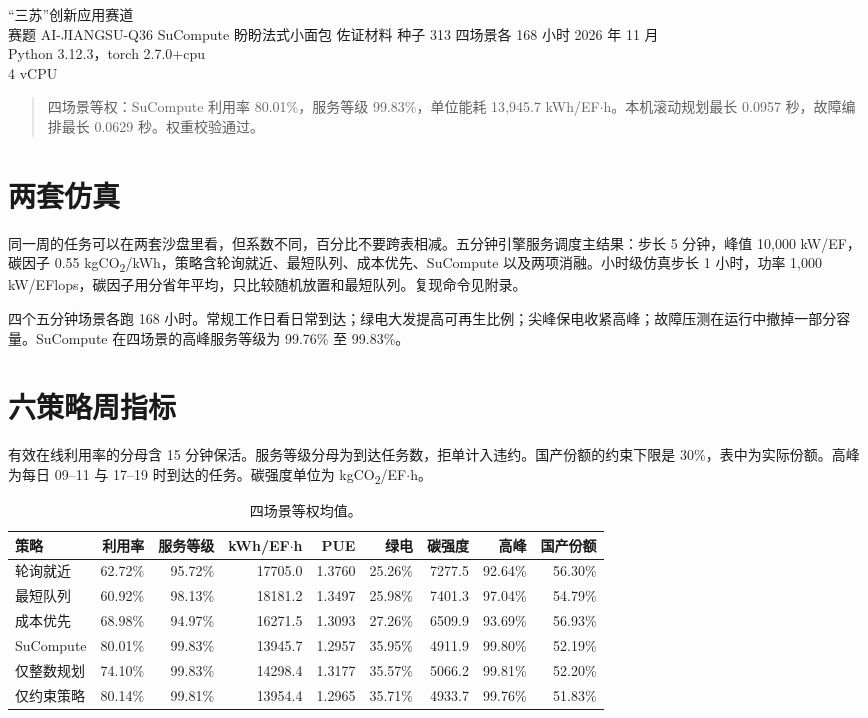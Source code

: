 

\contesttitlepage
  {“三苏”创新应用赛道\\赛题 AI-JIANGSU-Q36}
  {SuCompute}
  {盼盼法式小面包}
  {佐证材料}
  {种子 313 \quad 四场景各 168 小时}
  {2026 年 11 月\\Python 3.12.3，torch 2.7.0+cpu\\4 vCPU}

\begin{abstract}
四场景等权：SuCompute 利用率 80.01\%，服务等级 99.83\%，单位能耗 13{,}945.7 kWh/EF$\cdot$h。本机滚动规划最长 0.0957 秒，故障编排最长 0.0629 秒。权重校验通过。
\end{abstract}

\section{两套仿真}
同一周的任务可以在两套沙盘里看，但系数不同，百分比不要跨表相减。五分钟引擎服务调度主结果：步长 5 分钟，峰值 10{,}000 kW/EF，碳因子 0.55 kgCO\textsubscript{2}/kWh，策略含轮询就近、最短队列、成本优先、SuCompute 以及两项消融。小时级仿真步长 1 小时，功率 1{,}000 kW/EFlops，碳因子用分省年平均，只比较随机放置和最短队列。复现命令见附录。

四个五分钟场景各跑 168 小时。常规工作日看日常到达；绿电大发提高可再生比例；尖峰保电收紧高峰；故障压测在运行中撤掉一部分容量。SuCompute 在四场景的高峰服务等级为 99.76\% 至 99.83\%。

\section{六策略周指标}
有效在线利用率的分母含 15 分钟保活。服务等级分母为到达任务数，拒单计入违约。国产份额的约束下限是 30\%，表中为实际份额。高峰为每日 09--11 与 17--19 时到达的任务。碳强度单位为 kgCO\textsubscript{2}/EF$\cdot$h。

\begin{table}[ht]
\centering
\caption{四场景等权均值。}
\label{tab:six}
\footnotesize
\setlength{\tabcolsep}{2.6pt}
\begin{tabular}{lrrrrrrrr}
\toprule
策略 & 利用率 & 服务等级 & kWh/EF$\cdot$h & PUE & 绿电 & 碳强度 & 高峰 & 国产份额 \\
\midrule
轮询就近 & 62.72\% & 95.72\% & 17705.0 & 1.3760 & 25.26\% & 7277.5 & 92.64\% & 56.30\% \\
最短队列 & 60.92\% & 98.13\% & 18181.2 & 1.3497 & 25.98\% & 7401.3 & 97.04\% & 54.79\% \\
成本优先 & 68.98\% & 94.97\% & 16271.5 & 1.3093 & 27.26\% & 6509.9 & 93.69\% & 56.93\% \\
SuCompute & 80.01\% & 99.83\% & 13945.7 & 1.2957 & 35.95\% & 4911.9 & 99.80\% & 52.19\% \\
仅整数规划 & 74.10\% & 99.83\% & 14298.4 & 1.3177 & 35.57\% & 5066.2 & 99.81\% & 52.20\% \\
仅约束策略 & 80.14\% & 99.81\% & 13954.4 & 1.2965 & 35.71\% & 4933.7 & 99.76\% & 51.83\% \\
\bottomrule
\end{tabular}
\end{table}

